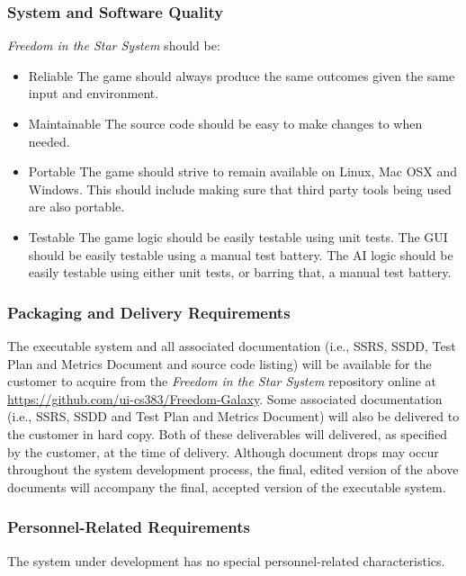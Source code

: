 \documentclass[twoside,letterpaper]{article}
\begin{document}
\subsubsection{System and Software Quality}

\textit{Freedom in the Star System} should be:
\begin{itemize}
	\item Reliable
		\subitem The game should always produce the same outcomes given the same input and environment.
	\item Maintainable
		\subitem The source code should be easy to make changes to when needed.
	\item Portable
		\subitem The game should strive to remain available on Linux, Mac OSX and Windows.  This should include making sure that third party tools being used are also portable.
	\item Testable
		\subitem The game logic should be easily testable using unit tests.
		\subitem The GUI should be easily testable using a manual test battery.
		\subitem The AI logic should be easily testable using either unit tests, or barring that, a manual test battery.
\end{itemize}

\subsubsection{Packaging and Delivery Requirements}

The executable system and all associated documentation (i.e., SSRS, SSDD, Test Plan and Metrics Document and source code listing) will be available for the customer to acquire from the \textit{Freedom in the Star System} repository online at \url{https://github.com/ui-cs383/Freedom-Galaxy}.  Some associated documentation (i.e., SSRS, SSDD and Test Plan and Metrics Document) will also be delivered to the customer in hard copy.  Both of these deliverables will delivered, as specified by the customer, at the time of delivery.  Although document drops may occur throughout the system development process, the final, edited version of the above documents will accompany the final, accepted version of the executable system.

\subsubsection{Personnel-Related Requirements}
The system under development has no special personnel-related
characteristics.
\end{document}
